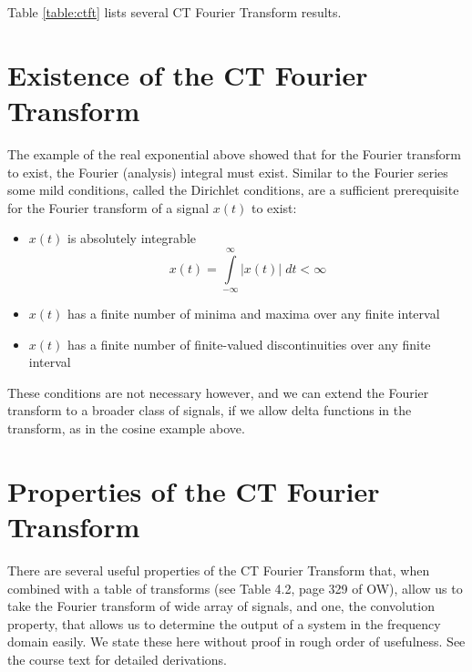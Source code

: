 \noindent Table \ref{table:ctft} lists several CT Fourier Transform results.

\section{Existence of the CT Fourier Transform}

The example of the real exponential above showed that for the Fourier transform to exist, the Fourier (analysis) integral must exist. Similar to the Fourier series some mild conditions, called the Dirichlet conditions, are a sufficient prerequisite for the Fourier transform of a signal $x(t)$ to exist:
\begin{itemize}
\item $x(t)$ is absolutely integrable
  \[
  x(t) = \int\limits_{-\infty}^{\infty} |x(t)|\; dt < \infty
  \]
\item $x(t)$ has a finite number of minima and maxima over any finite interval
\item $x(t)$ has a finite number of finite-valued discontinuities over any finite interval
\end{itemize}

These conditions are not necessary however, and we can extend the Fourier transform to a broader class of signals, if we allow delta functions in the transform, as in the cosine example above. 

\section{Properties of the CT Fourier Transform}

There are several useful properties of the CT Fourier Transform that, when combined with a table of transforms (see Table 4.2, page 329 of OW), allow us to take the Fourier transform of  wide array of signals, and one, the convolution property, that allows us to determine the output of a system in the frequency domain easily. We state these here without proof in rough order of usefulness. See the course text for detailed derivations.

